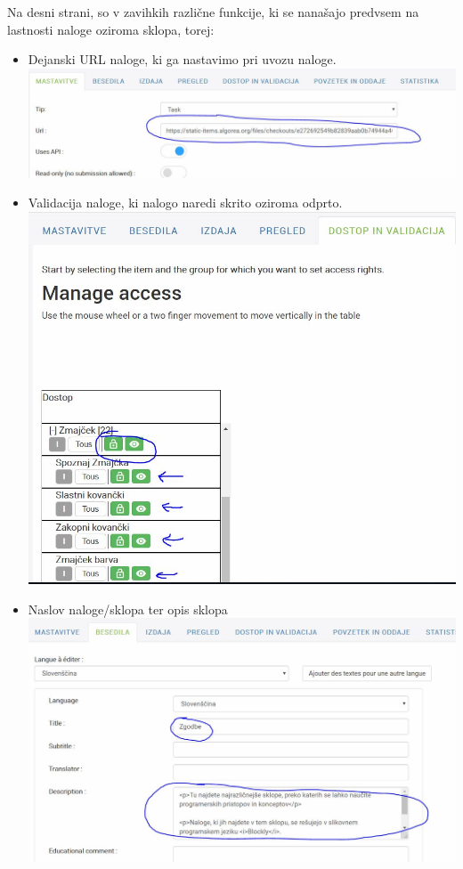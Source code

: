 \documentclass[11pt]{article} %
\begin{document}
Na desni strani, so v zavihkih različne funkcije, ki se nanašajo predvsem na lastnosti naloge oziroma sklopa, torej:
\begin{itemize}
\item Dejanski URL naloge, ki ga nastavimo pri uvozu naloge.\\
\includegraphics[scale=0.7]{task_url}
\item Validacija naloge, ki nalogo naredi skrito oziroma odprto.\\
\includegraphics[scale=0.4]{validacija_admin}
\pagebreak
\item Naslov naloge/sklopa ter opis sklopa\\
\includegraphics[scale=0.4]{naslov_besedilo}
\end{itemize}
\end{document}
